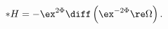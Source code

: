\begin{equation}
\label{2spinSU4H}
   * H = - \ex^{2\Phi}\diff \left(\ex^{-2\Phi}\re\Omega\right) .
\end{equation}

